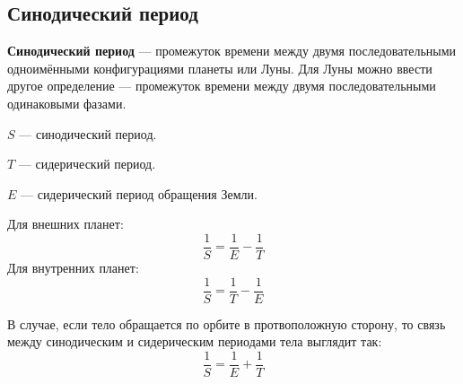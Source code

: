 \subsection{Синодический период}

\textbf{Синодический период} --- промежуток времени между двумя последовательными одноимёнными конфигурациями планеты или Луны. Для Луны можно ввести другое определение --- промежуток времени между двумя последовательными одинаковыми фазами.

$S$ --- синодический период.

$T$ --- сидерический период.

$E$ --- сидерический период обращения Земли.

Для внешних планет:
\begin{equation}\frac1S=\frac1E-\frac1T
\end{equation}
Для внутренних планет:
\begin{equation}\frac1S=\frac1T-\frac1E
\end{equation}

В случае, если тело обращается по орбите в протвоположную сторону, то связь между синодическим и сидерическим периодами тела выглядит так:
\begin{equation}\frac1S=\frac1E+\frac1T
\end{equation}